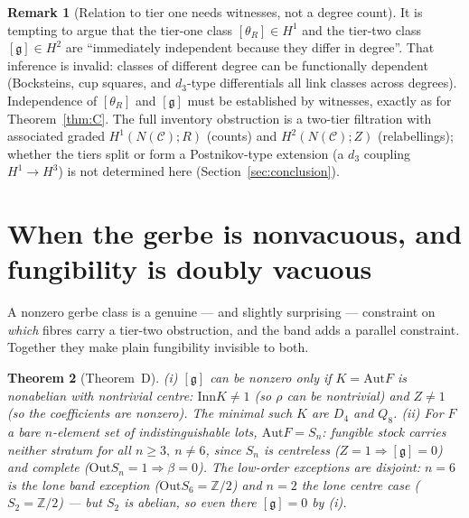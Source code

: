 \documentclass[11pt]{article}
\newtheorem{theorem}{Theorem}
\theoremstyle{definition}
\newtheorem{remark}[theorem]{Remark}
\newcommand{\C}{\mathcal{C}}
\newcommand{\Z}{\mathbb{Z}}
\newcommand{\Aut}{\mathrm{Aut}}
\newcommand{\Inn}{\mathrm{Inn}}
\newcommand{\Out}{\mathrm{Out}}
\newcommand{\Zc}{Z}
\newcommand{\gerbe}{\mathfrak{g}}
\begin{document}
\begin{remark}[Relation to tier one needs witnesses, not a degree count]\label{rem:tier1}
It is tempting to argue that the tier-one class $[\theta_R]\in H^1$ and the tier-two class
$[\gerbe]\in H^2$ are ``immediately independent because they differ in degree''. That inference is
invalid: classes of different degree can be functionally dependent (Bocksteins, cup squares, and
$d_3$-type differentials all link classes across degrees). Independence of $[\theta_R]$ and
$[\gerbe]$ must be established by witnesses, exactly as for Theorem~\ref{thm:C}. The full inventory
obstruction is a two-tier filtration with associated graded $H^1(N(\C);R)$ (counts) and
$H^2(N(\C);\Zc)$ (relabellings); whether the tiers split or form a Postnikov-type extension (a
$d_3$ coupling $H^1\to H^3$) is not determined here (Section~\ref{sec:conclusion}).
\end{remark}

\section{When the gerbe is nonvacuous, and fungibility is doubly vacuous}\label{sec:D}

A nonzero gerbe class is a genuine --- and slightly surprising --- constraint on \emph{which}
fibres carry a tier-two obstruction, and the band adds a parallel constraint. Together they make
plain fungibility invisible to both.

\begin{theorem}[Theorem~D]\label{thm:D}
\emph{(i)} $[\gerbe]$ can be nonzero only if $K=\Aut F$ is \emph{nonabelian with nontrivial centre}:
$\Inn K\neq1$ (so $\rho$ can be nontrivial) and $\Zc\neq1$ (so the coefficients are nonzero). The
minimal such $K$ are $D_4$ and $Q_8$. \emph{(ii)} For $F$ a bare $n$-element set of indistinguishable
lots, $\Aut F=S_n$: fungible stock carries \emph{neither} stratum for all $n\ge3,\ n\ne6$, since
$S_n$ is centreless ($\Zc=1\Rightarrow[\gerbe]=0$) and complete ($\Out S_n=1\Rightarrow\beta=0$).
The low-order exceptions are disjoint: $n=6$ is the lone band exception ($\Out S_6=\Z/2$) and $n=2$
the lone centre case ($S_2=\Z/2$) --- but $S_2$ is abelian, so even there $[\gerbe]=0$ by (i).
\end{theorem}
\end{document}
